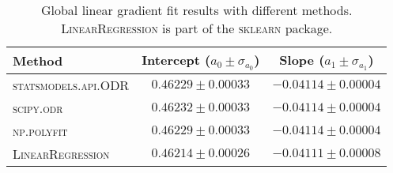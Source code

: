
\begin{table}
\caption{Global linear gradient fit results with different methods. \textsc{LinearRegression} is part of the \textsc{sklearn} package.}
\label{tab:global_fit_results_per_method}
\begin{tabularx}{\columnwidth}{lCC}
\hline
Method & Intercept ($a_0 \pm \sigma_{a_0}$) & Slope ($a_1 \pm \sigma_{a_1}$) \\
\hline
\textsc{statsmodels.api.ODR} & $0.46229 \pm 0.00033$ & $-0.04114 \pm 0.00004$ \\
\textsc{scipy.odr} & $0.46232 \pm 0.00033$ & $-0.04114 \pm 0.00004$ \\
\textsc{np.polyfit} & $0.46229 \pm 0.00033$ & $-0.04114 \pm 0.00004$ \\
\textsc{LinearRegression} & $0.46214 \pm 0.00026$ & $-0.04111 \pm 0.00008$ \\
\hline
\end{tabularx}
\end{table}
